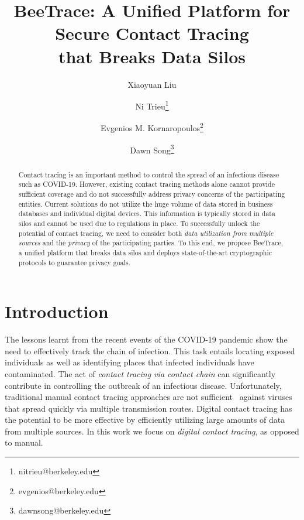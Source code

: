 \documentclass[11pt,dvipdfmx]{article}  %
\newcommand{\sysname}{\textsf{BeeTrace}\xspace}
\begin{document}
\title{\sysname: A Unified Platform for Secure Contact Tracing\\ that Breaks Data Silos}


\author[1,2]{Xiaoyuan Liu}
\author[2]{Ni Trieu\thanks{nitrieu@berkeley.edu}}
\author[2]{Evgenios M. Kornaropoulos\thanks{evgenios@berkeley.edu}}
\author[2,3]{Dawn Song\thanks{dawnsong@berkeley.edu}}

\maketitle

\begin{abstract}
    Contact tracing is an important method to control the spread of an infectious disease such as COVID-19. However, existing contact tracing methods alone cannot provide sufficient coverage and do not successfully address privacy concerns of the participating entities. Current solutions do not utilize the huge volume of data stored in business databases and individual digital devices. This information is typically stored in data silos and cannot be used due to regulations in place. To successfully unlock the potential of contact tracing, we need to consider both \emph{data utilization from multiple sources} and the \emph{privacy} of the participating parties. To this end, we propose \sysname, a unified platform that breaks data silos and deploys state-of-the-art cryptographic protocols to guarantee privacy goals. 
\end{abstract}

\section{Introduction}

The lessons learnt from the recent events of the COVID-19 pandemic show the need to effectively track the chain of infection.
This task entails locating exposed individuals as well as identifying places that infected individuals have contaminated. 
The act of \emph{contact tracing via contact chain} can  significantly contribute in controlling the outbreak of an infectious disease. Unfortunately, traditional manual contact tracing approaches are not sufficient~\cite{Farrahi2014} against viruses that spread quickly via multiple transmission routes.  Digital contact tracing has the potential to be more effective by efficiently utilizing large amounts of data from multiple sources. In this work we focus on \emph{digital contact tracing}, as opposed to manual.
\end{document}
